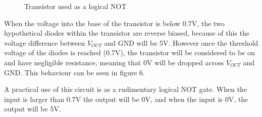 \documentclass[a4paper,11pt]{article}
\begin{document}
\begin{figure}[h]
 \begin{center}
  \caption{Transistor used as a logical NOT}
 \end{center}
\end{figure}

When the voltage into the base of the transistor is below 0.7V, the two hypothetical diodes within the transistor are reverse biased, because of this the voltage difference between $V_{OUT}$ and GND will be 5V. However once the threshold voltage of the diodes is reached (0.7V), the transistor will be considered to be on and have negligible resistance, meaning that 0V will be dropped across $V_{OUT}$ and GND. This behaviour can be seen in figure 6.

A practical use of this circuit is as a rudimentary logical NOT gate. When the input is larger than 0.7V the output will be 0V, and when the input is 0V, the output will be 5V.
\end{document}
